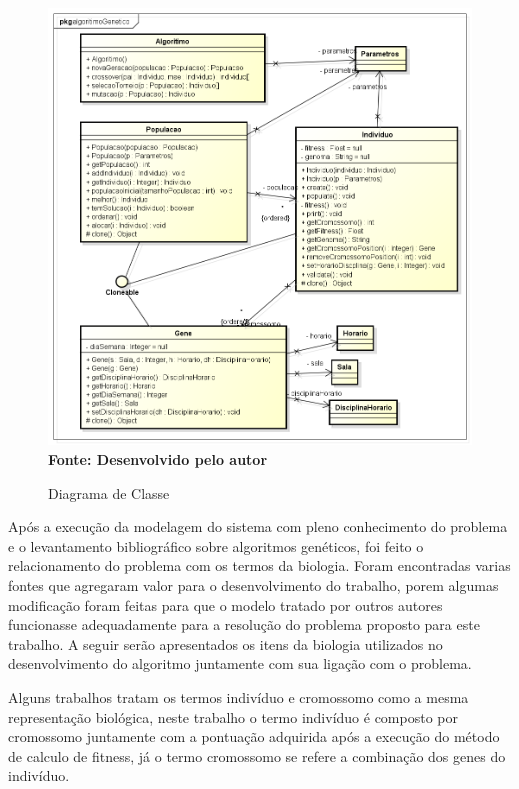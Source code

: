 \documentclass{abntpuc}
\begin{document}
\begin{figure}[!htb]
\caption[Diagrama de Classe]{Diagrama de Classe}
\label{fig:figura3}
\centering
\includegraphics[scale=0.6]{imagens/diagramaClasse.png}
\\ \textbf{\footnotesize Fonte: Desenvolvido pelo autor}
\end{figure}


Após a execução da modelagem do sistema com pleno conhecimento do problema e o levantamento bibliográfico sobre algoritmos genéticos, foi feito o relacionamento do problema com os termos da biologia. Foram encontradas varias fontes que agregaram valor para o desenvolvimento do trabalho, porem algumas modificação foram feitas para que o modelo tratado por outros autores funcionasse adequadamente para a resolução do problema proposto para este trabalho. A seguir serão apresentados os itens da biologia utilizados no desenvolvimento do algoritmo juntamente com sua ligação com o problema.\par


Alguns trabalhos tratam os termos indivíduo e cromossomo como a mesma representação biológica, neste trabalho o termo indivíduo é composto por cromossomo juntamente com a pontuação adquirida após a execução do método de calculo de fitness, já o termo cromossomo se refere a combinação dos genes do indivíduo.\par
\end{document}
